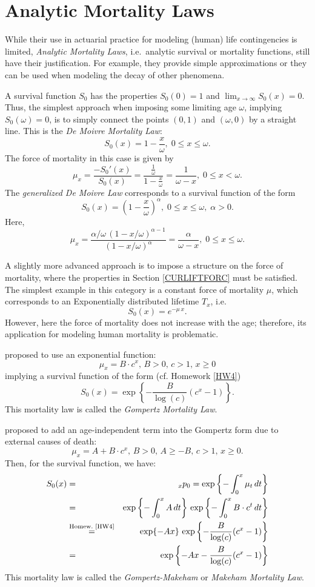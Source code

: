 \documentclass[11pt,fleqn,oneside]{book}
\begin{document}
\section{Analytic Mortality Laws}
\label{SECANALML}
While their use in actuarial practice for modeling (human) life contingencies is limited, \textit{Analytic Mortality Laws}, i.e.\ analytic survival or mortality functions, still have their justification. For example, they provide simple approximations or they can be used when modeling the decay of other phenomena. 

A survival function $S_0$ has the properties $S_0(0)=1$ and $\lim_{x\rightarrow \infty} S_0(x) = 0$. Thus, the simplest approach when imposing some limiting age $\omega$, implying $S_0(\omega)=0$, is to simply connect the points $(0,1)$ and $(\omega,0)$ by a straight line. This is the \textit{De Moivre Mortality Law}:
$$
S_0(x) = 1 - \frac{x}{\omega},\;0 \leq x \leq \omega.
$$
The force of mortality in this case is given by
$$
\mu_x= \frac{-S_0'(x)}{S_0(x)} = \frac{\frac{1}{\omega}}{1 - \frac{x}{\omega}} = \frac{1}{\omega - x},\;0 \leq x < \omega.
$$
The \textit{generalized De Moivre Law} corresponds to a survival function of the form
$$
S_0(x) = \left(1 - \frac{x}{\omega}\right)^{\alpha},\;0\leq x \leq \omega,\;\alpha>0.
$$
Here,
$$
\mu_x = \frac{\alpha/\omega\,(1-x/\omega)^{\alpha-1}}{(1-x/\omega)^{\alpha}} = \frac{\alpha}{\omega - x},\;0\leq x \leq \omega.
$$

A slightly more advanced approach is to impose a structure on the force of mortality, where the properties in Section \ref{CURLIFTFORC} must be satisfied. The simplest example in this category is a constant force of mortality $\mu$, which corresponds to an Exponentially distributed lifetime $T_x$, i.e.\
$$
S_0(x) = e^{-\mu\,x}.
$$
However, here the force of mortality does not increase with the age; therefore, its application for modeling human mortality is problematic.

\cite{GOMPERTZ} proposed to use an exponential function:
$$
\mu_x = B\cdot c^x,\,B>0,\,c>1,\,x\geq 0
$$
implying a survival function of the form (cf. Homework \ref{HW4})
$$
S_0(x) = \exp\left\{ - \frac{B}{\log(c)} (c^x - 1)\right\}. 
$$
This mortality law is called the \textit{Gompertz Mortality Law}.

\cite{MAKEHAM} proposed to add an age-independent term into the Gompertz form due to external causes of death:
$$
\mu_x = A + B\cdot c^x,\,B>0,\,A\geq -B,\,c>1,\,x\geq 0.
$$
Then, for the survival function, we have:
\begin{eqnarray*}
S_0(x) &=& {_xp_0} = \exp\left\{-\int_0^x \mu_t\,dt\right\}\\
&=& \exp\left\{-\int_0^x A\,dt\right\}\,\exp\left\{-\int_0^x B\cdot c^t\,dt\right\}\\
&\stackrel{\text{Homew.\ \ref{HW4}}}{=} & \exp\{-A x\}\,\exp\left\{ - \frac{B}{\log(c)} (c^x - 1)\right\} \\
&=& \exp\left\{ - Ax - \frac{B}{\log(c)} (c^x - 1)\right\}
\end{eqnarray*}
This mortality law is called the \textit{Gompertz-Makeham} or \textit{Makeham Mortality Law}.
\end{document}
